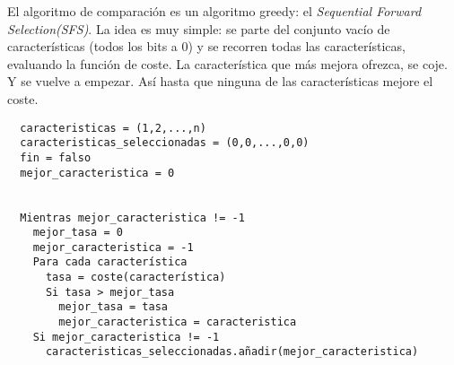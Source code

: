 El algoritmo de comparación es un algoritmo greedy: el \emph{Sequential Forward Selection(SFS)}. La idea es muy simple: se parte del conjunto vacío de características (todos los bits a 0) y se recorren todas las características, evaluando la función de coste. La característica que más mejora ofrezca, se coje. Y se vuelve a empezar. Así hasta que ninguna de las características mejore el coste.

\begin{verbatim}
  caracteristicas = (1,2,...,n)
  caracteristicas_seleccionadas = (0,0,...,0,0)
  fin = falso
  mejor_caracteristica = 0


  Mientras mejor_caracteristica != -1
    mejor_tasa = 0
    mejor_caracteristica = -1
    Para cada característica
      tasa = coste(característica)
      Si tasa > mejor_tasa
        mejor_tasa = tasa
        mejor_caracteristica = caracteristica
    Si mejor_caracteristica != -1
      caracteristicas_seleccionadas.añadir(mejor_caracteristica)
\end{verbatim}
